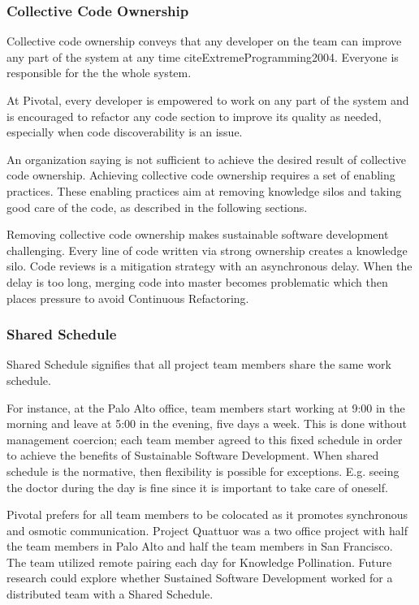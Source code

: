 \begin{table}[]
\subsubsection{Collective Code Ownership}
Collective code ownership conveys that any developer on the team can improve any part of the system at any time cite{ExtremeProgramming2004}. Everyone is responsible for the the whole system. 

At Pivotal, every developer is empowered to work on any part of the system and is encouraged to refactor any code section to improve its quality as needed, especially when code discoverability is an issue.

An organization saying  is not sufficient to achieve the desired result of collective code ownership. Achieving collective code ownership requires a set of enabling practices. These enabling practices aim at removing knowledge silos and taking good care of the code, as described in the following sections.

Removing collective code ownership makes sustainable software development challenging. Every line of code written via strong ownership creates a knowledge silo. Code reviews is a mitigation strategy with an asynchronous delay. When the delay is too long, merging code into master becomes problematic which then places pressure to avoid Continuous Refactoring.  

\subsubsection{Shared Schedule}

Shared Schedule signifies that all project team members share the same work schedule. 

For instance, at the Palo Alto office, team members start working at 9:00 in the morning and leave at 5:00 in the evening, five days a week. This is done without management coercion; each team member agreed to this fixed schedule in order to achieve the benefits of Sustainable Software Development. When shared schedule is the normative, then flexibility is possible for exceptions. E.g. seeing the doctor during the day is fine since it is important to take care of oneself.

Pivotal prefers for all team members to be colocated as it promotes synchronous and osmotic communication. Project Quattuor was a two office project with half the team members in Palo Alto and half the team members in San Francisco. The team utilized remote pairing each day for Knowledge Pollination. Future research could explore whether Sustained Software Development worked for a distributed team with a Shared Schedule.


\end{table}
